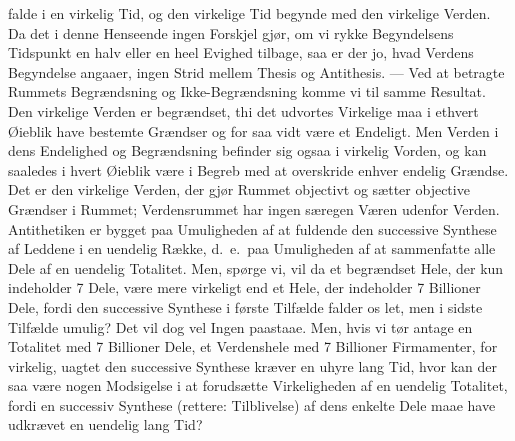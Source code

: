 \documentclass[12pt]{article}
\newcommand{\opage}[1]{\marginnote{\footnotesize\textit{[#1]}}}
\begin{document}
falde i en virkelig Tid, og den virkelige Tid begynde med
den virkelige Verden. Da det i denne Henseende ingen
Forskjel gjør, om vi rykke Begyndelsens Tidspunkt en halv eller
en heel Evighed tilbage, saa er der jo, hvad Verdens Begyndelse
angaaer, ingen Strid mellem Thesis og Antithesis. --- Ved
at betragte Rummets Begrændsning og Ikke-Begrændsning
komme vi til samme Resultat. Den virkelige Verden er begrændset,
thi det udvortes Virkelige maa i ethvert Øieblik
have bestemte Grændser og for saa vidt være et Endeligt. Men
Verden i dens Endelighed og Begrændsning befinder sig ogsaa
i virkelig Vorden, og kan saaledes i hvert Øieblik være i Begreb
med at overskride enhver endelig Grændse. Det er den
virkelige Verden, der gjør Rummet objectivt og sætter objective
Grændser i Rummet; Verdensrummet har ingen særegen Væren
udenfor Verden. Antithetiken er bygget paa Umuligheden af
at fuldende den successive Synthese af Leddene i en uendelig
Række, d.\ e.\ paa Umuligheden af at sammenfatte alle Dele af
en uendelig Totalitet. Men, spørge vi, vil da et begrændset
\opage{17} Hele, der kun indeholder 7 Dele, være mere virkeligt end et
Hele, der indeholder 7 Billioner Dele, fordi den successive
Synthese i første Tilfælde falder os let, men i sidste Tilfælde
umulig? Det vil dog vel Ingen paastaae. Men, hvis vi tør
antage en Totalitet med 7 Billioner Dele, et Verdenshele med
7 Billioner Firmamenter, for virkelig, uagtet den successive
Synthese kræver en uhyre lang Tid, hvor kan der saa være
nogen Modsigelse i at forudsætte Virkeligheden af en uendelig
Totalitet, fordi en successiv Synthese (rettere: Tilblivelse) af
dens enkelte Dele maae have udkrævet en uendelig lang Tid?
\end{document}
